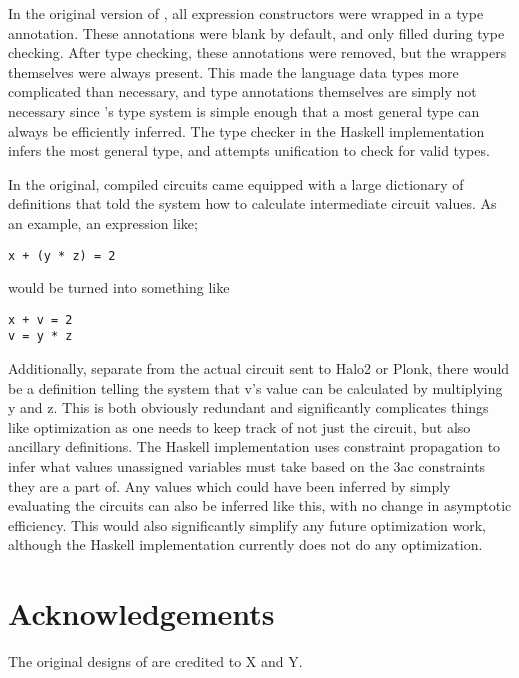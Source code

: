 \documentclass[
    9pt,            
    techreport,       
    affiltop,       
]{art}
\begin{document}
In the original version of \VampIR{}, all expression constructors were wrapped in a type annotation. These annotations were blank by default, and only filled during type checking. After type checking, these annotations were removed, but the wrappers themselves were always present. This made the language data types more complicated than necessary, and type annotations themselves are simply not necessary since \VampIR{}'s type system is simple enough that a most general type can always be efficiently inferred. The type checker in the Haskell implementation infers the most general type, and attempts unification to check for valid types.

In the original, compiled \VampIR{} circuits came equipped with a large dictionary of definitions that told the system how to calculate intermediate circuit values. As an example, an expression like;

\begin{verbatim}
x + (y * z) = 2
\end{verbatim}
would be turned into something like
\begin{verbatim}
x + v = 2
v = y * z
\end{verbatim}
Additionally, separate from the actual circuit sent to Halo2 or Plonk, there would be a definition telling the system that v's value can be calculated by multiplying y and z. This is both obviously redundant and significantly complicates things like optimization as one needs to keep track of not just the circuit, but also ancillary definitions. The Haskell implementation uses constraint propagation to infer what values unassigned variables must take based on the 3ac constraints they are a part of. Any values which could have been inferred by simply evaluating the circuits can also be inferred like this, with no change in asymptotic efficiency. This would also significantly simplify any future optimization work, although the Haskell implementation currently does not do any optimization.

\section{Acknowledgements}

The original designs of \VampIR{} are credited to X and Y.


\end{document}
